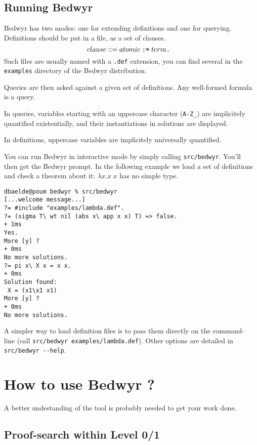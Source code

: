 \documentclass{article}
\begin{document}
\subsection{Running Bedwyr}

Bedwyr has two modes: one for extending definitions and one for querying.
Definitions should be put in a file, as a set of clauses.
\[ clause ::= atomic \;\verb.:=.\; term \verb|.| \]
Such files are usually named with a \verb|.def| extension, you can find several
in the \verb.examples. directory of the Bedwyr distribution.

Queries are then asked against a given set of definitions.
Any well-formed formula is a query.

In queries, variables starting with an uppercase character (\verb.A-Z_.)
are implicitely quantified existentially, and their instantiations in solutions
are displayed.

In definitions, uppercase variables are implicitely universally quantified.

You can run Bedwyr in interactive mode by simply calling \texttt{src/bedwyr}.
You'll then get the Bedwyr prompt. In the following example we load a set of 
definitions and check a theorem about it: $\lambda x.x\;x$ has no simple type.

\begin{verbatim}
dbaelde@poum bedwyr % src/bedwyr
[...welcome message...]
?= #include "examples/lambda.def".
?= (sigma T\ wt nil (abs x\ app x x) T) => false.
+ 1ms
Yes.
More [y] ?
+ 0ms
No more solutions.
?= pi x\ X x = x x.
+ 0ms
Solution found:
 X = (x1\x1 x1)
More [y] ?
+ 0ms
No more solutions.
\end{verbatim}

A simpler way to load definition files is to pass them directly on the
command-line (call \verb|src/bedwyr examples/lambda.def|).
Other options are detailed in \verb.src/bedwyr --help..

\section{How to use Bedwyr ?}
\label{sec:howto}

A better undestanding of the tool is probably needed to get your work done.

\subsection{Proof-search within Level 0/1}
\end{document}
